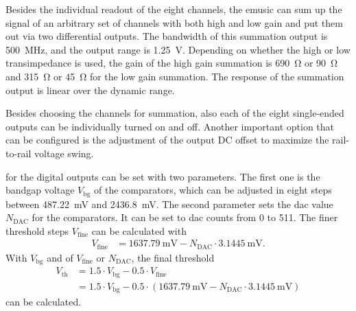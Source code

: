 Besides the individual readout of the eight channels, the \ac{emusic} can sum up the signal of an arbitrary set of channels with both high and low gain and put them out via two differential outputs.
The bandwidth of this summation output is \SI{500}{\mega\hertz}, and the output range is \SI{1.25}{\volt}.
Depending on whether the high or low transimpedance is used, the gain of the high gain summation is \SI{690}{\ohm} or \SI{90}{\ohm} and \SI{315}{\ohm} or \SI{45}{\ohm} for the low gain summation. 
The response of the summation output is linear over the dynamic range.

Besides choosing the channels for summation, also each of the eight single-ended outputs can be individually turned on and off.
Another important option that can be configured is the adjustment of the output DC offset to maximize the rail-to-rail voltage swing.

 for the digital outputs can be set with two parameters.
The first one is the bandgap voltage $V_\text{bg}$ of the comparators, which can be adjusted in eight steps between \SI{487.22}{\milli\volt} and \SI{2436.8}{\milli\volt}.
The second parameter sets the \ac{dac} value $N_\text{DAC}$ for the comparators.
It can be set to \ac{dac} counts from 0 to 511.
The finer threshold steps $V_\text{fine}$ can be calculated with
\begin{align}
	V_\text{fine}&=\SI{1637.79}{\milli\volt} - N_\text{DAC}\cdot\SI{3.1445}{\milli\volt}.
\end{align}
With $V_\text{bg}$ and  of $V_\text{fine}$ or $N_\text{DAC}$, the final threshold
\begin{align}
	V_\text{th}&= 1.5\cdot V_\text{bg} - 0.5\cdot V_\text{fine}\\
		   &= 1.5\cdot V_\text{bg} - 0.5\cdot (\SI{1637.79}{\milli\volt} - N_\text{DAC}\cdot\SI{3.1445}{\milli\volt})
\end{align}
can be calculated.

